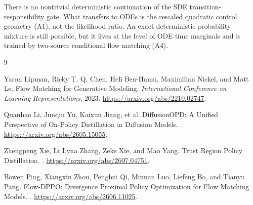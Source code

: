 \documentclass[11pt,a4paper]{article}
\theoremstyle{plain}
\theoremstyle{definition}
\begin{document}
\begin{tcolorbox}[colback=gray!5,colframe=gray!55,title=Main formal conclusion]
There is no nontrivial deterministic continuation of the SDE transition-responsibility gate.
What transfers to ODEs is the rescaled quadratic control geometry (A1), not the likelihood ratio.
An exact deterministic probability mixture is still possible, but it lives at the level of ODE
time marginals and is trained by two-source conditional flow matching (A4).
\end{tcolorbox}

\begin{thebibliography}{9}

Yaron Lipman, Ricky T. Q. Chen, Heli Ben-Hamu, Maximilian Nickel, and Matt Le.
\newblock Flow Matching for Generative Modeling.
\newblock \emph{International Conference on Learning Representations}, 2023.
\newblock \url{https://arxiv.org/abs/2210.02747}.

Quanhao Li, Junqiu Yu, Kaixun Jiang, et al.
\newblock DiffusionOPD: A Unified Perspective of On-Policy Distillation in Diffusion Models.
.
\newblock \url{https://arxiv.org/abs/2605.15055}.

Zhengpeng Xie, Li Lyna Zhang, Zeke Xie, and Mao Yang.
\newblock Trust Region Policy Distillation.
.
\newblock \url{https://arxiv.org/abs/2607.04751}.

Bowen Ping, Xiangxin Zhou, Penghui Qi, Minnan Luo, Liefeng Bo, and Tianyu Pang.
\newblock Flow-DPPO: Divergence Proximal Policy Optimization for Flow Matching Models.
.
\newblock \url{https://arxiv.org/abs/2606.11025}.

\end{thebibliography}
\end{document}
